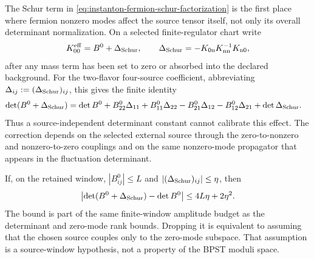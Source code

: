 \begin{controlledapproximation}
\label{ca:instanton-source-schur-zero-mode-correction}
The Schur term in
\eqref{eq:instanton-fermion-schur-factorization} is the first place where
fermion nonzero modes affect the source tensor itself, not only its overall
determinant normalization.  On a selected finite-regulator chart write
\begin{equation}
  K_{00}^{\rm eff}
  =
  B^{0}+\Delta_{\rm Schur},
  \qquad
  \Delta_{\rm Schur}
  =
  -K_{0{\rm n}}K_{{\rm nn}}^{-1}K_{{\rm n}0},
  \label{eq:instanton-source-schur-effective-matrix}
\end{equation}
after any mass term has been set to zero or absorbed into the declared
background.  For the two-flavor four-source coefficient, abbreviating
\(\Delta_{ij}:=(\Delta_{\rm Schur})_{ij}\), this gives the finite identity
\begin{equation}
\begin{aligned}
  \det(B^{0}+\Delta_{\rm Schur})
  &=
  \det B^{0}
  +
  B^{0}_{22}\Delta_{11}
  +
  B^{0}_{11}\Delta_{22}
  -
  B^{0}_{21}\Delta_{12}
  -
  B^{0}_{12}\Delta_{21}
  +
  \det\Delta_{\rm Schur}.
\end{aligned}
  \label{eq:instanton-source-schur-determinant-expansion}
\end{equation}
Thus a source-independent determinant constant cannot calibrate this effect.
The correction depends on the selected external source through the
zero-to-nonzero and nonzero-to-zero couplings and on the same nonzero-mode
propagator that appears in the fluctuation determinant.

If, on the retained window, \(|B^{0}_{ij}|\le L\) and
\(|(\Delta_{\rm Schur})_{ij}|\le\eta\), then
\begin{equation}
  \bigl|
  \det(B^{0}+\Delta_{\rm Schur})-\det B^{0}
  \bigr|
  \le
  4L\eta+2\eta^2 .
  \label{eq:instanton-source-schur-determinant-bound}
\end{equation}
The bound is part of the same finite-window amplitude budget as the determinant
and zero-mode rank bounds.  Dropping it is equivalent to assuming that the
chosen source couples only to the zero-mode subspace.  That assumption is a
source-window hypothesis, not a property of the BPST moduli space.
\end{controlledapproximation}

